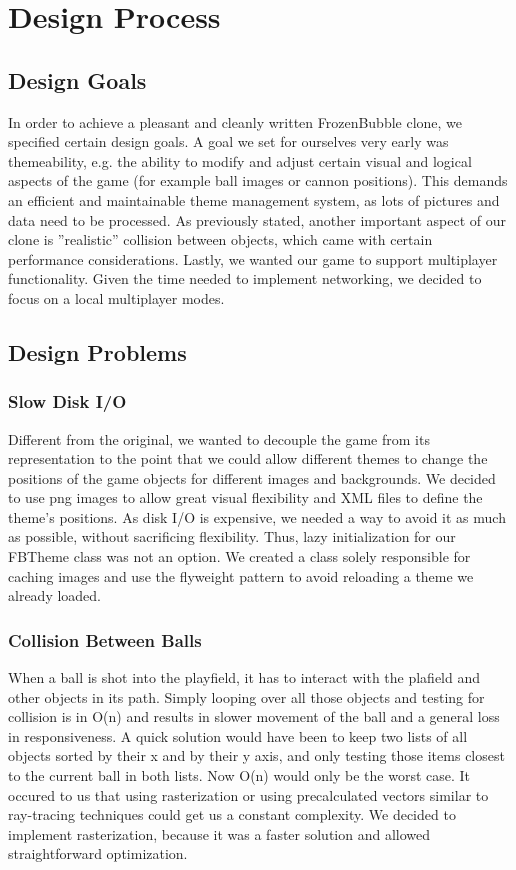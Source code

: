 \section{Design Process}
\subsection{Design Goals}
In order to achieve a pleasant and cleanly written FrozenBubble clone, we specified certain design goals.
A goal we set for ourselves very early was themeability, e.g. the ability to modify and 
adjust certain visual and logical aspects of the game (for example ball images or 
cannon positions). This demands an efficient and maintainable theme management 
system, as lots of pictures and data need to be processed.
As previously stated, another important aspect of our clone is ''realistic'' 
collision between objects, which came with certain performance considerations.
Lastly, we wanted our game to support multiplayer functionality. Given the time 
needed to implement networking, we decided to focus on a local multiplayer modes. 

\subsection{Design Problems}
\subsubsection{Slow Disk I/O}
%
Different from the original, we wanted to decouple the game from its representation 
to the point that we could allow different themes to change the positions of the 
game objects for different images and backgrounds. We decided to use png images to allow 
great visual flexibility and XML files to define the theme's positions. As disk I/O
is expensive, we needed a way to avoid it as much as possible, without sacrificing 
flexibility. Thus, lazy initialization for our FBTheme class was not an option. 
We created a class solely responsible for caching images and use the flyweight 
pattern to avoid reloading a theme we already loaded.
%
\subsubsection{Collision Between Balls}
\label{sec:collision}
When a ball is shot into the playfield, it has to interact with the plafield 
and other objects in its path. Simply looping over all those objects and 
testing for collision is in O(n) and results in slower 
movement of the ball and a general loss in responsiveness. A quick solution 
would have been to keep two lists of all objects sorted by their x and by their 
y axis, and only testing those items closest to the current ball in both lists.
Now O(n) would only be the worst case. 
It occured to us that using rasterization or using precalculated vectors similar 
to ray-tracing techniques could get us a constant complexity. We decided 
to implement rasterization, because it was a faster solution and allowed straightforward
 optimization.
%
